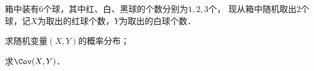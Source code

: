 \documentclass[plain,noanswer,medmath]{../../template/jnuexam}
\begin{document}






\begin{problem}[points=11]
箱中装有$6$个球，其中红、白、黑球的个数分别为$1,2,3$个，
现从箱中随机取出$2$个球，记$X$为取出的红球个数，$Y$为取出的白球个数．\par
\begin{enumerate*}
\item 求随机变量$(X,Y)$的概率分布； 
\item 求$\Cov (X,Y)$．
\end{enumerate*}
\end{problem}
\end{document}
